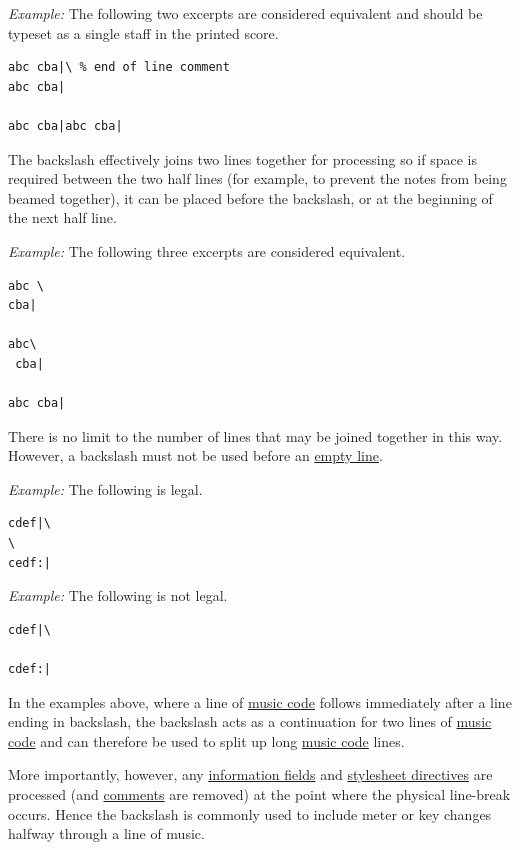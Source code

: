\documentclass[oneside]{book}
\begin{document}
\emph{Example:} The following two excerpts are considered equivalent and
should be typeset as a single staff in the printed score.

\begin{verbatim}
abc cba|\ % end of line comment
abc cba|

abc cba|abc cba|
\end{verbatim}

The backslash effectively joins two lines together for processing so if
space is required between the two half lines (for example, to prevent
the notes from being beamed together), it can be placed before the
backslash, or at the beginning of the next half line.

\emph{Example:} The following three excerpts are considered equivalent.

\begin{verbatim}
abc \
cba|

abc\
 cba|

abc cba|  
\end{verbatim}

There is no limit to the number of lines that may be joined together in
this way. However, a backslash must not be used before an
\protect\hyperlink{empty_line_definition}{empty line}.

\emph{Example:} The following is legal.

\begin{verbatim}
cdef|\
\
cedf:|
\end{verbatim}

\emph{Example:} The following is not legal.

\begin{verbatim}
cdef|\

cdef:|
\end{verbatim}

In the examples above, where a line of
\protect\hyperlink{music_code_definition}{music code} follows
immediately after a line ending in backslash, the backslash acts as a
continuation for two lines of
\protect\hyperlink{music_code_definition}{music code} and can therefore
be used to split up long \protect\hyperlink{music_code_definition}{music
code} lines.

More importantly, however, any
\protect\hyperlink{information_field_definition}{information fields} and
\protect\hyperlink{stylesheet_directive_definition}{stylesheet
directives} are processed (and
\protect\hyperlink{comment_definition}{comments} are removed) at the
point where the physical line-break occurs. Hence the backslash is
commonly used to include meter or key changes halfway through a line of
music.
\end{document}
